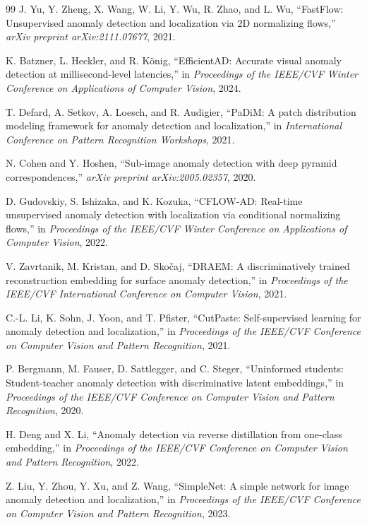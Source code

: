 \documentclass[10pt,conference]{IEEEtran}
\begin{document}
\begin{thebibliography}{99}
J. Yu, Y. Zheng, X. Wang, W. Li, Y. Wu, R. Zhao, and L. Wu, ``FastFlow:
Unsupervised anomaly detection and localization via 2D normalizing flows,''
\emph{arXiv preprint arXiv:2111.07677}, 2021.

K. Batzner, L. Heckler, and R. K\"onig, ``EfficientAD: Accurate visual
anomaly detection at millisecond-level latencies,'' in \emph{Proceedings of
the IEEE/CVF Winter Conference on Applications of Computer Vision}, 2024.

T. Defard, A. Setkov, A. Loesch, and R. Audigier, ``PaDiM: A patch
distribution modeling framework for anomaly detection and localization,''
in \emph{International Conference on Pattern Recognition Workshops}, 2021.

N. Cohen and Y. Hoshen, ``Sub-image anomaly detection with deep pyramid
correspondences,'' \emph{arXiv preprint arXiv:2005.02357}, 2020.

D. Gudovskiy, S. Ishizaka, and K. Kozuka, ``CFLOW-AD: Real-time
unsupervised anomaly detection with localization via conditional
normalizing flows,'' in \emph{Proceedings of the IEEE/CVF Winter Conference
on Applications of Computer Vision}, 2022.

V. Zavrtanik, M. Kristan, and D. Sko\v{c}aj, ``DRAEM: A discriminatively
trained reconstruction embedding for surface anomaly detection,'' in
\emph{Proceedings of the IEEE/CVF International Conference on Computer
Vision}, 2021.

C.-L. Li, K. Sohn, J. Yoon, and T. Pfister, ``CutPaste: Self-supervised
learning for anomaly detection and localization,'' in \emph{Proceedings of
the IEEE/CVF Conference on Computer Vision and Pattern Recognition}, 2021.

P. Bergmann, M. Fauser, D. Sattlegger, and C. Steger, ``Uninformed
students: Student-teacher anomaly detection with discriminative latent
embeddings,'' in \emph{Proceedings of the IEEE/CVF Conference on Computer
Vision and Pattern Recognition}, 2020.

H. Deng and X. Li, ``Anomaly detection via reverse distillation from
one-class embedding,'' in \emph{Proceedings of the IEEE/CVF Conference on
Computer Vision and Pattern Recognition}, 2022.

Z. Liu, Y. Zhou, Y. Xu, and Z. Wang, ``SimpleNet: A simple network for
image anomaly detection and localization,'' in \emph{Proceedings of the
IEEE/CVF Conference on Computer Vision and Pattern Recognition}, 2023.


\end{thebibliography}
\end{document}

